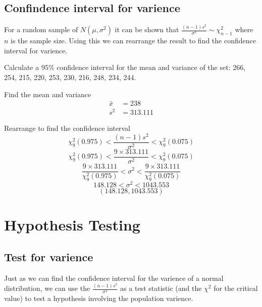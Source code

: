     \subsection{Confindence interval for varience}
        For a random sample of $N(\mu, \sigma^2)$ it can be shown that $\displaystyle\frac{(n-1)s^2}{\sigma^2} \sim \chi^2_{n-1}$ where $n$ is the sample size. Using this we can rearrange the result to find the confidence interval for varience.

        \begin{example}
        {
            Calculate a 95\% confidence interval for the mean and variance of the set: 266, 254, 215, 220, 253, 230, 216, 248, 234, 244.
        }

        \begin{step}{Find the mean and variance}
        \begin{align*}
        \bar{x} &= 238 \\
        s^2 &= 313.111
        \end{align*}
        \end{step}

        \begin{step}{Rearrange to find the confidence interval}
        $$\chi^2_9(0.975) < \frac{(n-1)s^2}{\sigma^2} < \chi^2_9(0.075)$$
        $$\chi^2_9(0.975) < \frac{9 \times 313.111}{\sigma^2} < \chi^2_9(0.075)$$
        $$\frac{9 \times 313.111}{\chi^2_9(0.975)} < \sigma^2 < \frac{9 \times 313.111}{\chi^2_9(0.075)}$$
        $$148.128 < \sigma^2 < 1043.553$$
        $$(148.128, 1043.553)$$
        \end{step}

        \end{example}

\section{Hypothesis Testing}


    \subsection{Test for varience}
        Just as we can find the confidence interval for the varience of a normal distribution, we can use the $\displaystyle\frac{(n-1)s^2}{\sigma^2}$ as a test statistic (and the $\chi^2$ for the critical value) to test a hypothesis involving the population varience.


